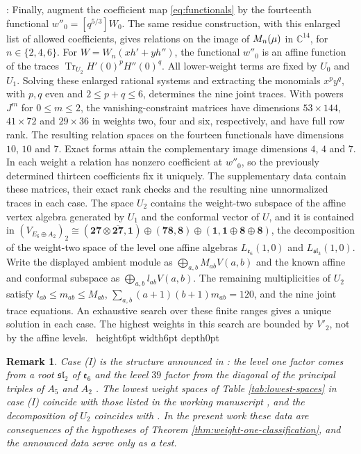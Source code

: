 \documentclass[leqno]{article}
\newcommand{\Cbb}{\ensuremath{\mathbb{C}}}
\let\cal\relax
\newcommand{\cal}{\mathcal}
\renewcommand{\leq}{\ensuremath{\leqslant}}
\newcommand{\qed}{\hfill \vrule height6pt  width6pt depth0pt}
\newcommand{\ot}{\otimes}
\newtheorem{remark}[thm]{Remark}
\newenvironment{proof}[1][]{\noindent {\it Proof #1} : }{\hbox{~}\qed
\smallskip
}
\numberwithin{equation}{section}
\begin{document}
\begin{proof}
Finally, augment the coefficient map \eqref{eq:functionals} by the fourteenth functional $w''_0 = [q^{5/3}]W_0$. The same residue construction, with this enlarged list of allowed coefficients, gives relations on the image of $\cal M_n(\mu)$ in $\Cbb^{14}$, for $n \in \{2,4,6\}$. For $W = W_n(xh'+yh'')$, the functional $w''_0$ is an affine function of the traces $\operatorname{Tr}_{U_2}H'(0)^pH''(0)^q$. All lower-weight terms are fixed by $U_0$ and $U_1$. Solving these enlarged rational systems and extracting the monomials $x^py^q$, with $p,q$ even and $2 \leq p+q \leq 6$, determines the nine joint traces. With powers $J^m$ for $0 \leq m \leq 2$, the vanishing-constraint matrices have dimensions $53 \times 144$, $41 \times 72$ and $29 \times 36$ in weights two, four and six, respectively, and have full row rank. The resulting relation spaces on the fourteen functionals have dimensions $10$, $10$ and $7$. Exact forms attain the complementary image dimensions $4$, $4$ and $7$. In each weight a relation has nonzero coefficient at $w''_0$, so the previously determined thirteen coefficients fix it uniquely. The supplementary data contain these matrices, their exact rank checks and the resulting nine unnormalized traces in each case. The space $U_2$ contains the weight-two subspace of the affine vertex algebra generated by $U_1$ and the conformal vector of $U$, and it is contained in $(V_{E_6 \oplus A_2})_2 \cong (\mathbf{27} \ot \overline{\mathbf{27}},\mathbf 1) \oplus (\mathbf{78},\mathbf 8) \oplus (\mathbf 1,\mathbf 1 \oplus \mathbf 8 \oplus \mathbf 8)$, the decomposition of the weight-two space of the level one affine algebras $L_{\mathfrak e_6}(1,0)$ and $L_{\mathfrak{sl}_3}(1,0)$. Write the displayed ambient module as $\bigoplus_{a,b}M_{ab}V(a,b)$ and the known affine and conformal subspace as $\bigoplus_{a,b}l_{ab}V(a,b)$. The remaining multiplicities of $U_2$ satisfy $l_{ab} \leq m_{ab} \leq M_{ab}$, $\sum_{a,b}(a+1)(b+1)m_{ab} = 120$, and the nine joint trace equations. An exhaustive search over these finite ranges gives a unique solution in each case. The highest weights in this search are bounded by $V'_2$, not by the affine levels.
\end{proof}

\begin{remark}\normalfont
\label{rem:case-one-announced}
Case (I) is the structure announced in \cite{Rie26,Hua26}: the level one factor comes from a root $\mathfrak{sl}_2$ of $\mathfrak e_6$ and the level $39$ factor from the diagonal of the principal triples of $A_5$ and $A_2$ \cite[Section 1]{Rie26b}. The lowest weight spaces of Table \ref{tab:lowest-spaces} in case (I) coincide with those listed in the working manuscript \cite{Rie26b}, and the decomposition of $U_2$ coincides with \cite[Appendix H.1]{Rie26b}. In the present work these data are consequences of the hypotheses of Theorem \ref{thm:weight-one-classification}, and the announced data serve only as a test.
\end{remark}
\end{document}
